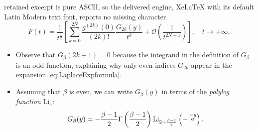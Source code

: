\documentclass[10pt,a4paper]{amsart}
\DeclareMathOperator{\ee}{\rm e}
\newcommand{\Boh}{\mathcal{O}}
\begin{document}
retained excerpt is pure ASCII, so the delivered engine, XeLaTeX with its default Latin Modern text font, reports no missing character.
    \begin{equation}\label{eq:LaplaceExpformula}
        F(t) = \frac{1}{t^{\frac{1}{2} }} \left[ \sum_{k=0}^{2N } \frac{g^{(2k)}(0)}{(2k)!} \frac{G_{2k}(y)}{t^{k}} + \Boh \left( \frac{1}{t^{2N+1}}\right) \right], \quad t \to +\infty,
    \end{equation}

\begin{remark} \hfill
\begin{itemize}
    \item Observe that $G_\beta(2k+1) = 0$ because the integrand in the definition of $G_\beta$ is an odd function, explaining why only even indices $G_{2k}$ appear in the expansion \eqref{eq:LaplaceExpformula}.
    \item Assuming that $\beta$ is even, we can write $G_\beta(y)$ in terms of the \textit{polylog function} $\text{Li}_{\gamma}$:
    \[
        G_\beta(y) 
        = - \frac{\beta - 1}{2} \Gamma \left( \frac{\beta - 1}{2}\right) \text{Li}_{2 + \frac{\beta - 1}{2}} \left(- \ee^{-y}\right).
    \]
\end{itemize}
    
\end{remark}
\end{document}
